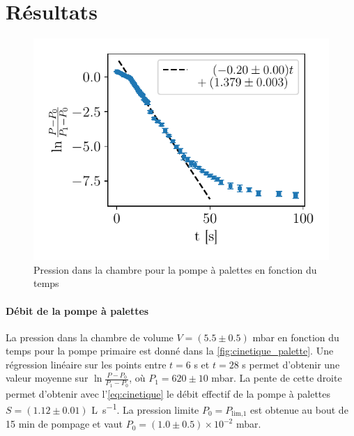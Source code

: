 \section{Résultats}


\begin{minipage}{\textwidth}
    \begin{figure}
        \centering
        \includegraphics[width=\linewidth]{figures/cinetique_palettes.pdf}
        \caption{Pression dans la chambre pour la pompe à palettes en fonction du temps}
        \label{fig:cinetique_palette}
    \end{figure}
    
    \paragraph*{Débit de la pompe à palettes}
    La pression dans la chambre de volume \(V = (5.5 \pm 0.5)\) \si{\milli\bar} en fonction du temps pour la pompe primaire est donné dans la \autoref{fig:cinetique_palette}. Une régression linéaire sur les points entre \(t = 6\) \si{\second} et \(t = 28\) \si{\second} permet d'obtenir une valeur moyenne sur \(\ln{\frac{P - P_0}{P_1 - P_0}}\), où \(P_1 = 620 \pm 10\) \si{\milli\bar}. La pente de cette droite permet d'obtenir avec l'\autoref{eq:cinetique} le débit effectif de la pompe à palettes \(S = (1.12 \pm 0.01)\) \si{\liter \per \second}. La pression limite \(P_0 = P_\textrm{lim,1}\) est obtenue au bout de 15 \si{\minute} de pompage et vaut \(P_0 = (1.0 \pm 0.5) \times 10^{-2}\) \si{\milli\bar}.
\end{minipage}

